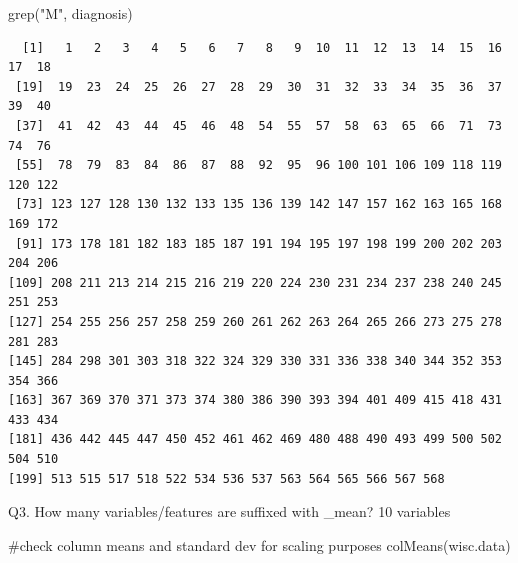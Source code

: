 \documentclass[
  letterpaper,
  DIV=11,
  numbers=noendperiod]{scrartcl}
\newenvironment{Shaded}{\begin{snugshade}}{\end{snugshade}}
\newcommand{\CommentTok}[1]{\textcolor[rgb]{0.37,0.37,0.37}{#1}}
\newcommand{\FunctionTok}[1]{\textcolor[rgb]{0.28,0.35,0.67}{#1}}
\newcommand{\NormalTok}[1]{\textcolor[rgb]{0.00,0.23,0.31}{#1}}
\newcommand{\StringTok}[1]{\textcolor[rgb]{0.13,0.47,0.30}{#1}}
\begin{document}
\begin{Shaded}
\begin{Highlighting}[]
\FunctionTok{grep}\NormalTok{(}\StringTok{"M"}\NormalTok{, diagnosis)}
\end{Highlighting}
\end{Shaded}

\begin{verbatim}
  [1]   1   2   3   4   5   6   7   8   9  10  11  12  13  14  15  16  17  18
 [19]  19  23  24  25  26  27  28  29  30  31  32  33  34  35  36  37  39  40
 [37]  41  42  43  44  45  46  48  54  55  57  58  63  65  66  71  73  74  76
 [55]  78  79  83  84  86  87  88  92  95  96 100 101 106 109 118 119 120 122
 [73] 123 127 128 130 132 133 135 136 139 142 147 157 162 163 165 168 169 172
 [91] 173 178 181 182 183 185 187 191 194 195 197 198 199 200 202 203 204 206
[109] 208 211 213 214 215 216 219 220 224 230 231 234 237 238 240 245 251 253
[127] 254 255 256 257 258 259 260 261 262 263 264 265 266 273 275 278 281 283
[145] 284 298 301 303 318 322 324 329 330 331 336 338 340 344 352 353 354 366
[163] 367 369 370 371 373 374 380 386 390 393 394 401 409 415 418 431 433 434
[181] 436 442 445 447 450 452 461 462 469 480 488 490 493 499 500 502 504 510
[199] 513 515 517 518 522 534 536 537 563 564 565 566 567 568
\end{verbatim}

Q3. How many variables/features are suffixed with \_mean? 10 variables

\begin{Shaded}
\begin{Highlighting}[]
\CommentTok{\#check column means and standard dev for scaling purposes}
\FunctionTok{colMeans}\NormalTok{(wisc.data)}
\end{Highlighting}
\end{Shaded}
\end{document}
